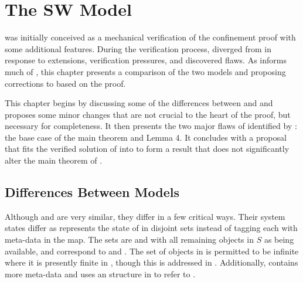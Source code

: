 

\begingroup



\chapter{The SW Model}
\label{ch:SW}

\TMmodelName{} was initially conceived as a mechanical verification of the \TMSW{} confinement proof \cite{ShapiroWeber2000} with some additional features.
During the verification process, \TMmodelName{} diverged from \TMSW{} in response to extensions, verification pressures, and discovered flaws.
As \TMSW{} informs much of \TMmodelName{}, this chapter presents a comparison of the two models and proposing corrections to \TMSW{} based on the \TMmodelName{} proof.

This chapter begins by discussing some of the differences between \TMSW{} and \TMmodelName{} and proposes some minor changes that are not crucial to the heart of the proof, but necessary for completeness.
It then presents the two major flaws of \TMSW{} identified by \TMmodelName{}: the base case of the main theorem and Lemma 4.
It concludes with a proposal that fits the verified solution of \TMmodelName{} into \TMSW{} to form a result that does not significantly alter the main theorem of \TMSW{}.

\section{Differences Between Models}
\label{sec:SW:model}
\label{sec:SW:model:def}

Although \TMmodelName{} and \TMSW{} are very similar, they differ in a few critical ways.
Their system states differ as \TMSW{} represents the state of \TMobjs{} in disjoint sets instead of tagging each \TMobj{} with meta-data in the map.
The sets are  and  with all remaining objects in \(S\) as being available, and correspond to \COQalive{} and \COQunborn{} \TMobjLabels{}.
The set of objects \objectset{} in \TMSW{} is permitted to be infinite where it is presently finite in \TMmodelName{}, though this is addressed in .
Additionally, \TMmodelName{} contains more \TMobj{} meta-data and uses an \TMidx{} structure in \TMobjs{} to refer to \TMcaps{}.

